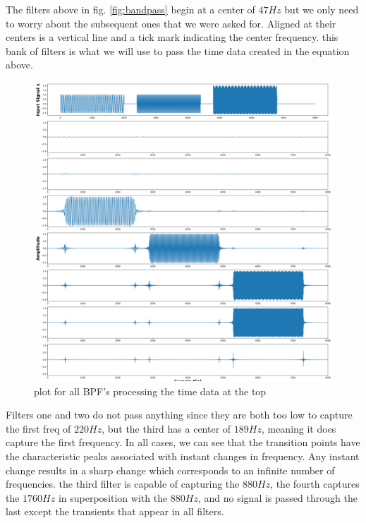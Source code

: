 \documentclass[a4paper, 11pt]{exam}
\begin{document}
\newline
The filters above in fig. \ref{fig:bandpass} begin at a center of $47Hz$ but we only need to worry about the subsequent ones that we were asked for. Aligned at their centers is a vertical line and a tick mark indicating the center frequency. this bank of filters is what we will use to pass the time data created in the equation above. 
\newpage
\begin{figure}[h!]
  \centering
  \hspace*{-1.5cm}\includegraphics[width=17cm]{../images/time_data.png}
  \caption{plot for all BPF's processing the time data at the top}
  \label{fig:time_data}
\end{figure}
Filters one and two do not pass anything since they are both too low to capture the first freq of $220Hz$, but the third has a center of $189Hz$, meaning it does capture the first frequency. In all cases, we can see that the transition points have the characteristic peaks associated with instant changes in frequency. Any instant change results in a sharp change which corresponds to an infinite number of frequencies. the third filter is capable of capturing the $880Hz$, the fourth captures the $1760Hz$ in superposition with the $880Hz$, and no signal is passed through the last except the transients that appear in all filters.
\newpage
\end{document}
